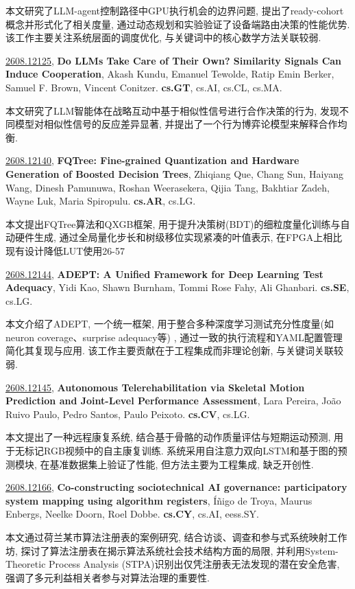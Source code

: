 \documentclass[9pt, a4paper]{article}
\theoremstyle{plain}
\theoremstyle{definition}
\theoremstyle{remark}
\newcommand{\arxivwithtarget}[3]{\hypertarget{#1}{}\href{https://arxiv.org/abs/#1}{#1}, \textbf{\textcolor{arxivblue}{#2}}, #3. }
\begin{document}
本文研究了LLM-agent控制路径中GPU执行机会的边界问题, 提出了ready-cohort概念并形式化了相关度量, 通过动态规划和实验验证了设备端路由决策的性能优势. 该工作主要关注系统层面的调度优化, 与关键词中的核心数学方法关联较弱.


\arxivwithtarget{2608.12125}{Do LLMs Take Care of Their Own? Similarity Signals Can Induce Cooperation}{Akash Kundu, Emanuel Tewolde, Ratip Emin Berker, Samuel F. Brown, Vincent Conitzer}\textbf{cs.GT}, cs.AI, cs.CL, cs.MA.

本文研究了LLM智能体在战略互动中基于相似性信号进行合作决策的行为, 发现不同模型对相似性信号的反应差异显著, 并提出了一个行为博弈论模型来解释合作均衡.


\arxivwithtarget{2608.12140}{FQTree: Fine-grained Quantization and Hardware Generation of Boosted Decision Trees}{Zhiqiang Que, Chang Sun, Haiyang Wang, Dinesh Pamunuwa, Roshan Weerasekera, Qijia Tang, Bakhtiar Zadeh, Wayne Luk, Maria Spiropulu}\textbf{cs.AR}, cs.LG.

本文提出FQTree算法和QXGB框架, 用于提升决策树(BDT)的细粒度量化训练与自动硬件生成, 通过全局量化步长和树级移位实现紧凑的叶值表示, 在FPGA上相比现有设计降低LUT使用26-57%


\arxivwithtarget{2608.12144}{ADEPT: A Unified Framework for Deep Learning Test Adequacy}{Yidi Kao, Shawn Burnham, Tommi Rose Fahy, Ali Ghanbari}\textbf{cs.SE}, cs.LG.

本文介绍了ADEPT, 一个统一框架, 用于整合多种深度学习测试充分性度量(如neuron coverage、surprise adequacy等) , 通过一致的执行流程和YAML配置管理简化其复现与应用. 该工作主要贡献在于工程集成而非理论创新, 与关键词关联较弱.


\arxivwithtarget{2608.12145}{Autonomous Telerehabilitation via Skeletal Motion Prediction and Joint-Level Performance Assessment}{Lara Pereira, João Ruivo Paulo, Pedro Santos, Paulo Peixoto}\textbf{cs.CV}, cs.LG.

本文提出了一种远程康复系统, 结合基于骨骼的动作质量评估与短期运动预测, 用于无标记RGB视频中的自主康复训练. 系统采用自注意力双向LSTM和基于图的预测模块, 在基准数据集上验证了性能, 但方法主要为工程集成, 缺乏开创性.


\arxivwithtarget{2608.12166}{Co-constructing sociotechnical AI governance: participatory system mapping using algorithm registers}{Íñigo de Troya, Maurus Enbergs, Neelke Doorn, Roel Dobbe}\textbf{cs.CY}, cs.AI, eess.SY.

本文通过荷兰某市算法注册表的案例研究, 结合访谈、调查和参与式系统映射工作坊, 探讨了算法注册表在揭示算法系统社会技术结构方面的局限, 并利用System-Theoretic Process Analysis (STPA)识别出仅凭注册表无法发现的潜在安全危害, 强调了多元利益相关者参与对算法治理的重要性.
\end{document}
